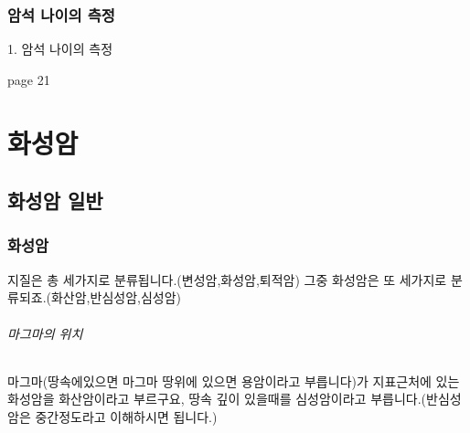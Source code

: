 \documentclass[12pt, a4paper, twoside]{book}
\begin{document}
	\clearpage
	\section{암석 나이의 측정}
	



1. 		암석 나이의 측정

page 21













	
	
		\part{화성암}
	



	\clearpage
	\chapter{화성암 일반}
	\minitoc				%
	

	\clearpage
	\section{화성암}



		지질은 총 세가지로 분류됩니다.(변성암,화성암,퇴적암)
		그중 화성암은 또 세가지로 분류되죠.(화산암,반심성암,심성암)

		\paragraph{마그마의 위치}
		마그마(땅속에있으면 마그마 땅위에 있으면 용암이라고 부릅니다)가 지표근처에 있는 화성암을 화산암이라고 부르구요, 
		땅속 깊이 있을때를 심성암이라고 부릅니다.(반심성암은 중간정도라고 이해하시면 됩니다.)
\end{document}
